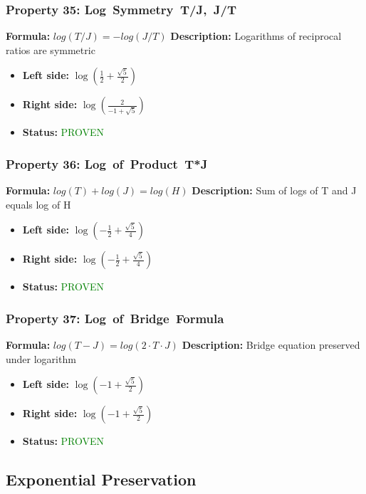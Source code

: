 \subsubsection*{Property 35: Log~Symmetry~T/J,~J/T}
\textbf{Formula:} $log(T/J) = -log(J/T)$
\textbf{Description:} Logarithms of reciprocal ratios are symmetric

\begin{itemize}
\item \textbf{Left side:} $\log{\left(\frac{1}{2} + \frac{\sqrt{5}}{2} \right)}$
\item \textbf{Right side:} $\log{\left(\frac{2}{-1 + \sqrt{5}} \right)}$
\item \textbf{Status:} \textcolor{green}{PROVEN}
\end{itemize}

\subsubsection*{Property 36: Log~of~Product~T*J}
\textbf{Formula:} $log(T) + log(J) = log(H)$
\textbf{Description:} Sum of logs of T and J equals log of H

\begin{itemize}
\item \textbf{Left side:} $\log{\left(- \frac{1}{2} + \frac{\sqrt{5}}{4} \right)}$
\item \textbf{Right side:} $\log{\left(- \frac{1}{2} + \frac{\sqrt{5}}{4} \right)}$
\item \textbf{Status:} \textcolor{green}{PROVEN}
\end{itemize}

\subsubsection*{Property 37: Log~of~Bridge~Formula}
\textbf{Formula:} $log(T-J) = log(2 \cdot T \cdot J)$
\textbf{Description:} Bridge equation preserved under logarithm

\begin{itemize}
\item \textbf{Left side:} $\log{\left(-1 + \frac{\sqrt{5}}{2} \right)}$
\item \textbf{Right side:} $\log{\left(-1 + \frac{\sqrt{5}}{2} \right)}$
\item \textbf{Status:} \textcolor{green}{PROVEN}
\end{itemize}


\subsection{Exponential Preservation}

